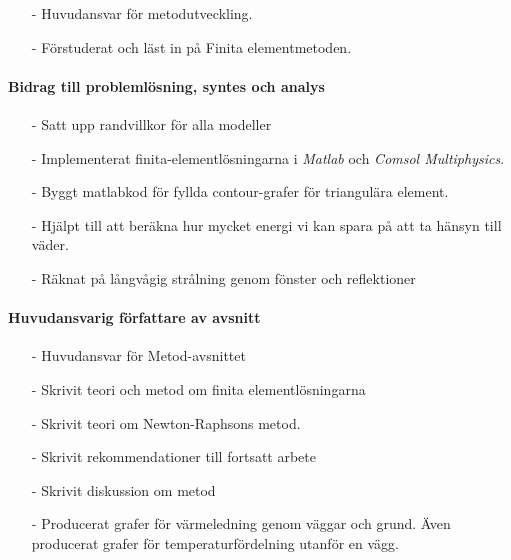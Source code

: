 \documentclass[12pt,a4paper]{article}
\begin{document}
\begin{itemize}
\item[-] Huvudansvar för metodutveckling.
\item[-] Förstuderat och läst in på Finita elementmetoden.
\end{itemize}

 \paragraph{Bidrag till problemlösning, syntes och analys}

\begin{itemize}

\item[-] Satt upp randvillkor för alla modeller
\item[-] Implementerat finita-elementlösningarna i \emph{Matlab} och \emph{Comsol Multiphysics}.
\item[-] Byggt matlabkod för fyllda contour-grafer för triangulära element.
\item[-] Hjälpt till att beräkna hur mycket energi vi kan spara på att ta hänsyn till väder.
\item[-] Räknat på långvågig strålning genom fönster och reflektioner
\end{itemize}

\paragraph{Huvudansvarig författare av avsnitt}

\begin{itemize}
\item[-] Huvudansvar för Metod-avsnittet
\item[-] Skrivit teori och metod om finita elementlösningarna
\item[-] Skrivit teori om Newton-Raphsons metod.
\item[-] Skrivit rekommendationer till fortsatt arbete
\item[-] Skrivit diskussion om metod
\item[-] Producerat grafer för värmeledning genom väggar och grund. Även producerat
grafer för temperaturfördelning utanför en vägg.
\end{itemize}
\end{document}
